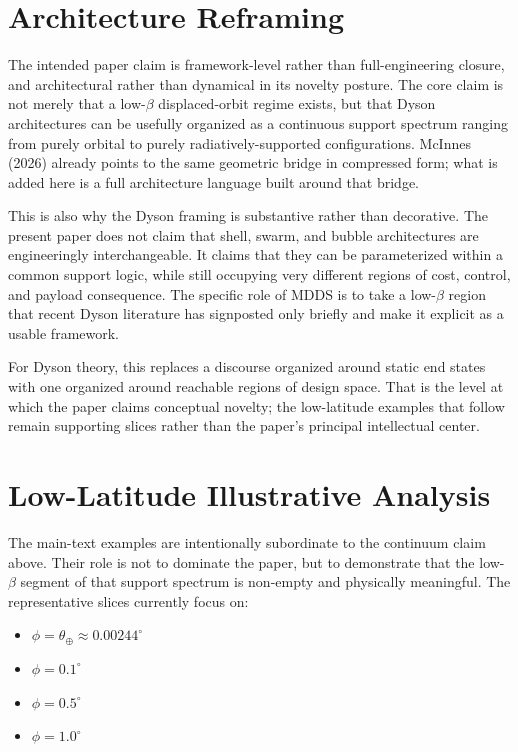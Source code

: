 \documentclass[11pt]{article}
\begin{document}
\section{Architecture Reframing}

The intended paper claim is framework-level rather than full-engineering closure, and
architectural rather than dynamical in its novelty posture. The core claim is not merely that
a low-$\beta$ displaced-orbit regime exists, but that Dyson architectures can be usefully
organized as a continuous support spectrum ranging from purely orbital to purely
radiatively-supported configurations. McInnes (2026) already points to the same geometric
bridge in compressed form; what is added here is a full architecture language built around
that bridge.

This is also why the Dyson framing is substantive rather than decorative. The present paper
does not claim that shell, swarm, and bubble architectures are engineeringly interchangeable.
It claims that they can be parameterized within a common support logic, while still occupying
very different regions of cost, control, and payload consequence. The specific role of MDDS is
to take a low-$\beta$ region that recent Dyson literature has signposted only briefly and
make it explicit as a usable framework.

For Dyson theory, this replaces a discourse organized around static end states with one
organized around reachable regions of design space. That is the level at which the paper
claims conceptual novelty; the low-latitude examples that follow remain supporting slices
rather than the paper's principal intellectual center.

\section{Low-Latitude Illustrative Analysis}

The main-text examples are intentionally subordinate to the continuum claim above. Their role
is not to dominate the paper, but to demonstrate that the low-$\beta$ segment of that support
spectrum is non-empty and physically meaningful. The representative slices currently focus on:
\begin{itemize}[leftmargin=1.5em]
  \item $\phi = \theta_\oplus \approx 0.00244^\circ$
  \item $\phi = 0.1^\circ$
  \item $\phi = 0.5^\circ$
  \item $\phi = 1.0^\circ$
\end{itemize}
\end{document}
